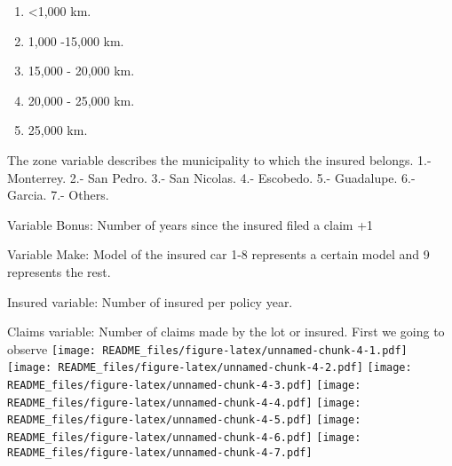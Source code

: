 \documentclass[
]{article}
\providecommand{\tightlist}{%
  \setlength{\itemsep}{0pt}\setlength{\parskip}{0pt}}
\begin{document}
\begin{enumerate}
\def\labelenumi{\arabic{enumi}.}
\tightlist
\item
  \textless1,000 km.
\item
  1,000 -15,000 km.
\item
  15,000 - 20,000 km.
\item
  20,000 - 25,000 km.
\item
  25,000 km.
\end{enumerate}

The zone variable describes the municipality to which the insured
belongs. 1.- Monterrey. 2.- San Pedro. 3.- San Nicolas. 4.- Escobedo.
5.- Guadalupe. 6.- Garcia. 7.- Others.

Variable Bonus: Number of years since the insured filed a claim +1

Variable Make: Model of the insured car 1-8 represents a certain model
and 9 represents the rest.

Insured variable: Number of insured per policy year.

Claims variable: Number of claims made by the lot or insured. First we
going to observe
\texttt{[image: README\_files/figure-latex/unnamed-chunk-4-1.pdf]}
\texttt{[image: README\_files/figure-latex/unnamed-chunk-4-2.pdf]}
\texttt{[image: README\_files/figure-latex/unnamed-chunk-4-3.pdf]}
\texttt{[image: README\_files/figure-latex/unnamed-chunk-4-4.pdf]}
\texttt{[image: README\_files/figure-latex/unnamed-chunk-4-5.pdf]}
\texttt{[image: README\_files/figure-latex/unnamed-chunk-4-6.pdf]}
\texttt{[image: README\_files/figure-latex/unnamed-chunk-4-7.pdf]}

\begin{verbatim}


\end{verbatim}
\end{document}
